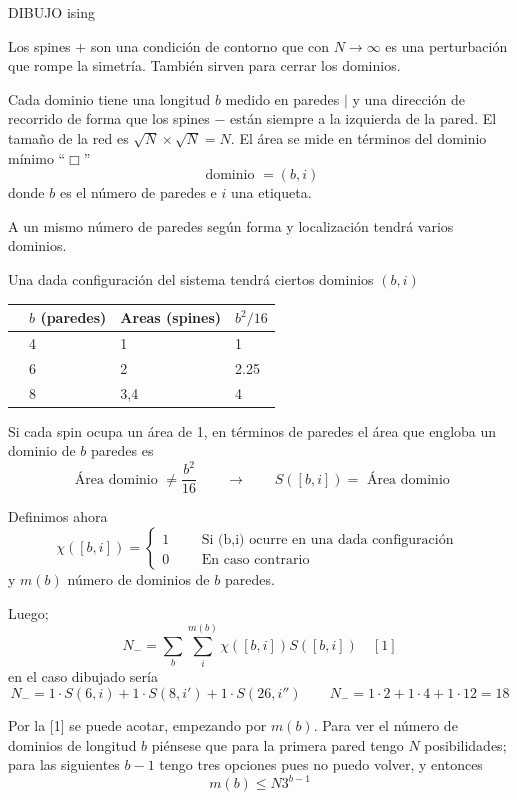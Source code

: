 \documentclass[10pt,oneside]{CBFT_book}
\begin{document}
DIBUJO ising


Los spines $+$ son una condición de contorno que con $N\to\infty$ es una perturbación que rompe la
simetría. También sirven para cerrar los dominios.

Cada dominio tiene una longitud $b$ medido en paredes $|$ y una dirección de recorrido de forma que 
los spines $-$ están siempre a la izquierda de la pared.
El tamaño de la red es $\sqrt{N} \times \sqrt{N} = N$. El área se mide en términos del dominio 
mínimo ``$\Box$''
\[
	\text{ dominio } = (b,i)
\]
donde $b$ es el número de paredes e $i$ una etiqueta.

A un mismo número de paredes según forma y localización tendrá varios dominios.

Una dada configuración del sistema tendrá ciertos dominios $(b,i)$

\begin{center}
\begin{tabular}{llll}
 & $b$ (paredes) & Areas (spines) & $b^2/16$ \\
\hline
 & 4 & 1 & 1\\
 & 6 & 2 & 2.25\\
 & 8 & 3,4 & 4
\end{tabular}
\end{center}

Si cada spin ocupa un área de 1, en términos de paredes el área que engloba un dominio de $b$ paredes
es 
\[
	\text{ Área dominio } \neq \frac{b^2}{16} \qquad \rightarrow \qquad S([b,i]) = \text{ Área dominio}
\]

Definimos ahora 
\[
	\chi([b,i]) = \begin{cases}
	              1 \qquad \text{ Si (b,i) ocurre en una dada configuración } \\
	              0 \qquad \text{ En caso contrario}
	             \end{cases}
\]
y $m(b)$ número de dominios de $b$ paredes.

Luego;
\[
	\boxed{ N_- = \sum_b \sum_i^{m(b)} \chi([b,i]) S([b,i]) } \quad [1]
\]
en el caso dibujado sería
\[
	N_- = 1 \cdot S(6,i) + 1 \cdot S(8,i') + 1 \cdot S(26,i'') \qquad 
	N_- = 1 \cdot  2 + 1 \cdot  4 + 1 \cdot 12 = 18
\]

Por la [1] se puede acotar, empezando por $m(b)$. Para ver el número de dominios de longitud $b$ piénsese que 
para la primera pared tengo $N$ posibilidades; para las siguientes $b-1$ tengo tres opciones pues no puedo volver,
y entonces 
\[
	m(b) \leq N 3^{b-1}
\]
\end{document}
